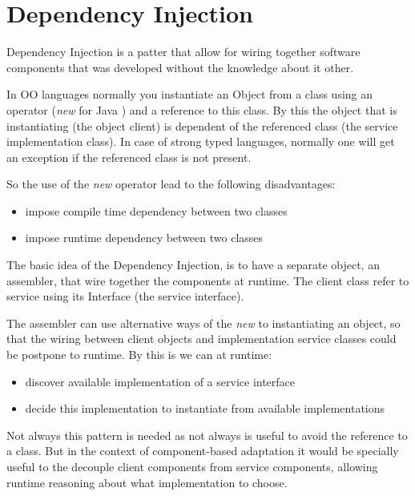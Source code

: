 \section{Dependency Injection}

Dependency Injection is a patter that allow for wiring together software components that was developed without the knowledge about it other. \cite{fowler_inversion_2004}

In OO languages normally you instantiate an Object from a class using an operator (\textit{new} for Java ) and a reference to this class. By this the object that is instantiating (the object client) is dependent of the referenced class (the service implementation class). In case of strong typed languages, normally one will get an exception if the referenced class is not present.

So the use of the \textit{new} operator lead to the following disadvantages:
\begin{itemize}
  \item impose compile time dependency between two classes
  \item impose runtime dependency between two classes
\end{itemize}

The basic idea of the Dependency Injection, is to have a separate object, an assembler, that wire together the components at runtime\cite{fowler_inversion_2004}. The client class refer to service using its Interface (the service interface).

The assembler can use alternative ways of the \textit{new} to instantiating an object, so that the wiring between client objects and implementation service classes could be postpone to runtime.
By this is we can at runtime:
\begin{itemize}
  \item discover available implementation of a service interface
  \item decide this implementation to instantiate from available implementations
\end{itemize}

Not always this pattern is needed as not always is useful to avoid the reference to a class. But in the context of component-based adaptation it would be specially useful to the decouple client components from service components, allowing runtime reasoning about what implementation to choose.

